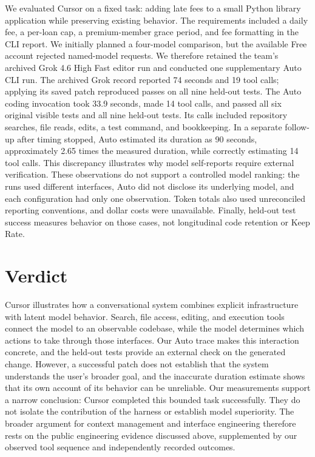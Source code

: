\documentclass[11pt]{article}
\begin{document}
We evaluated Cursor on a fixed task: adding late fees to a small Python library application while preserving existing behavior. The requirements included a daily fee, a per-loan cap, a premium-member grace period, and fee formatting in the CLI report. We initially planned a four-model comparison, but the available Free account rejected named-model requests. We therefore retained the team's archived Grok 4.6 High Fast editor run and conducted one supplementary Auto CLI run. The archived Grok record reported 74 seconds and 19 tool calls; applying its saved patch reproduced passes on all nine held-out tests. The Auto coding invocation took 33.9 seconds, made 14 tool calls, and passed all six original visible tests and all nine held-out tests. Its calls included repository searches, file reads, edits, a test command, and bookkeeping. In a separate follow-up after timing stopped, Auto estimated its duration as 90 seconds, approximately 2.65 times the measured duration, while correctly estimating 14 tool calls. This discrepancy illustrates why model self-reports require external verification. These observations do not support a controlled model ranking: the runs used different interfaces, Auto did not disclose its underlying model, and each configuration had only one observation. Token totals also used unreconciled reporting conventions, and dollar costs were unavailable. Finally, held-out test success measures behavior on those cases, not longitudinal code retention or Keep Rate.

\section{Verdict}

Cursor illustrates how a conversational system combines explicit infrastructure with latent model behavior. Search, file access, editing, and execution tools connect the model to an observable codebase, while the model determines which actions to take through those interfaces. Our Auto trace makes this interaction concrete, and the held-out tests provide an external check on the generated change. However, a successful patch does not establish that the system understands the user's broader goal, and the inaccurate duration estimate shows that its own account of its behavior can be unreliable. Our measurements support a narrow conclusion: Cursor completed this bounded task successfully. They do not isolate the contribution of the harness or establish model superiority. The broader argument for context management and interface engineering therefore rests on the public engineering evidence discussed above, supplemented by our observed tool sequence and independently recorded outcomes.
\end{document}
